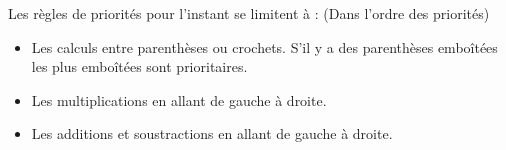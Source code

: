 


\begin{prop}{}{}
Les règles de priorités pour l'instant se limitent à : (Dans l'ordre des priorités)
\begin{itemize}
	\item Les calculs entre parenthèses ou crochets. S'il y a des parenthèses emboîtées les plus emboîtées sont prioritaires.
	\item Les multiplications en allant de gauche à droite.
	\item Les additions et soustractions en allant de gauche à droite.
\end{itemize}
\end{prop}


	

